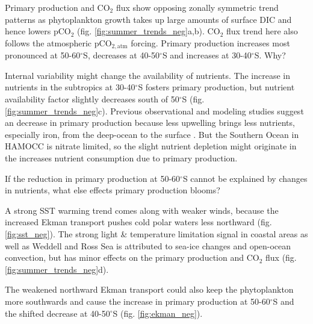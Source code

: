 \documentclass[12pt]{article}
\begin{document}
  
Primary production and CO$_2$ flux show opposing zonally symmetric trend patterns as phytoplankton growth takes up large amounts of surface DIC and hence lowers pCO$_2$ (fig. \ref{fig:summer_trends_neg}a,b). CO$_2$ flux trend here also follows the atmospheric pCO$_{2,\text{atm}}$ forcing. Primary production increases most pronounced at 50-60$^\circ$S, decreases at 40-50$^\circ$S and increases at 30-40$^\circ$S. Why?

Internal variability might change the availability of nutrients. 
The increase in nutrients in the subtropics at 30-40$^\circ$S fosters primary production, but nutrient availability factor slightly decreases south of 50$^\circ$S (fig. \ref{fig:summer_trends_neg}c). 
Previous observational and modeling studies suggest an decrease in primary production because less upwelling brings less nutrients, especially iron, from the deep-ocean to the surface \citep{Tagliabue2014}. But the Southern Ocean in HAMOCC is nitrate limited, so the slight nutrient depletion might originate in the increases nutrient consumption due to primary production.  \newline

If the reduction in primary production at 50-60$^\circ$S cannot be explained by changes in nutrients, what else effects primary production blooms?

A strong SST warming trend comes along with weaker winds, because the increased Ekman transport pushes cold polar waters less northward (fig. \ref{fig:sst_neg}). The strong light \& temperature limitation signal in coastal areas as well as Weddell and Ross Sea is attributed to sea-ice changes and open-ocean convection, but has minor effects on the primary production and CO$_2$ flux (fig. \ref{fig:summer_trends_neg}d). 

The weakened northward Ekman transport could also keep the phytoplankton more southwards and cause the increase in primary production at 50-60$^\circ$S and the shifted decrease at 40-50$^\circ$S (fig. \ref{fig:ekman_neg}).
\end{document}
